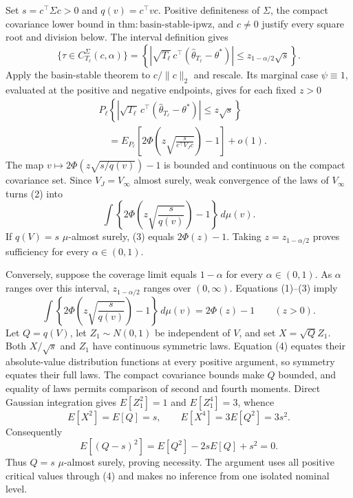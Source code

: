 Set \(s=c^\top\Sigma c>0\) and \(q(v)=c^\top vc\). Positive definiteness of \(\Sigma\), the compact covariance lower bound in \(\mathrm{thm:basin\text{-}stable\text{-}ipwz}\), and \(c\ne0\) justify every square root and division below. The interval definition gives
\[
 \{\tau\in C_{T_\ell}^{\Sigma}(c,\alpha)\}
 =\left\{\left|\sqrt{T_\ell}\,c^\top
 (\widehat\theta_{T_\ell}-\theta^*)\right|
 \le z_{1-\alpha/2}\sqrt s\right\}.
\tag{1}
\]
Apply the basin-stable theorem to \(c/\|c\|_2\) and rescale. Its marginal case \(\psi\equiv1\), evaluated at the positive and negative endpoints, gives for each fixed \(z>0\)
\[
\begin{aligned}
 &P_\ell\!\left\{\left|\sqrt{T_\ell}\,c^\top
 (\widehat\theta_{T_\ell}-\theta^*)\right|\le z\sqrt s\right\}\\
 &\quad=E_{P_\ell}\!\left[
 2\Phi\!\left(z\sqrt{\frac{s}{c^\top V_Jc}}\right)-1\right]+o(1).
\end{aligned}
\tag{2}
\]
The map \(v\mapsto2\Phi(z\sqrt{s/q(v)})-1\) is bounded and continuous on the compact covariance set. Since \(V_J=V_\infty\) almost surely, weak convergence of the laws of \(V_\infty\) turns (2) into
\[
 \int\left\{2\Phi\!\left(z\sqrt{\frac{s}{q(v)}}\right)-1\right\}
 \,d\mu(v).
\tag{3}
\]
If \(q(V)=s\) \(\mu\)-almost surely, (3) equals \(2\Phi(z)-1\). Taking \(z=z_{1-\alpha/2}\) proves sufficiency for every \(\alpha\in(0,1)\).

Conversely, suppose the coverage limit equals \(1-\alpha\) for every \(\alpha\in(0,1)\). As \(\alpha\) ranges over this interval, \(z_{1-\alpha/2}\) ranges over \((0,\infty)\). Equations (1)--(3) imply
\[
 \int\left\{2\Phi\!\left(z\sqrt{\frac{s}{q(v)}}\right)-1\right\}
 \,d\mu(v)=2\Phi(z)-1\qquad(z>0).
\tag{4}
\]
Let \(Q=q(V)\), let \(Z_1\sim N(0,1)\) be independent of \(V\), and set \(X=\sqrt QZ_1\). Both \(X/\sqrt s\) and \(Z_1\) have continuous symmetric laws. Equation (4) equates their absolute-value distribution functions at every positive argument, so symmetry equates their full laws. The compact covariance bounds make \(Q\) bounded, and equality of laws permits comparison of second and fourth moments. Direct Gaussian integration gives \(E[Z_1^2]=1\) and \(E[Z_1^4]=3\), whence
\[
 E[X^2]=E[Q]=s,
 \qquad E[X^4]=3E[Q^2]=3s^2.
\tag{5}
\]
Consequently
\[
 E[(Q-s)^2]=E[Q^2]-2sE[Q]+s^2=0.
\tag{6}
\]
Thus \(Q=s\) \(\mu\)-almost surely, proving necessity. The argument uses all positive critical values through (4) and makes no inference from one isolated nominal level.